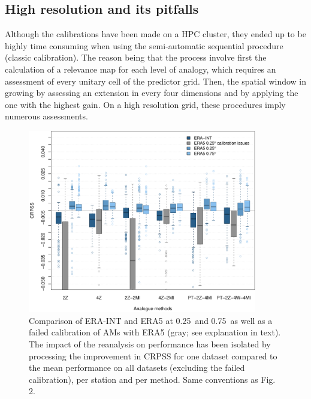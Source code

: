 \documentclass[alpha-refs]{wiley-article}
\begin{document}
\subsection{High resolution and its pitfalls}
\label{sec:results_hires}

Although the calibrations have been made on a HPC cluster, they ended up to be highly time consuming when using the semi-automatic sequential procedure (classic calibration). The reason being that the process involve first the calculation of a relevance map for each level of analogy, which requires an assessment of every unitary cell of the predictor grid. Then, the spatial window in growing by assessing an extension in every four dimensions and by applying the one with the highest gain. On a high resolution grid, these procedures imply numerous assessments.

\begin{figure}[bt]
	\centering
	\includegraphics[width=100mm]{figures/boxplot-resol-diff.pdf}
	\caption{Comparison of ERA-INT and ERA5 at 0.25\degree\ and 0.75\degree\ as well as a failed calibration of AMs with ERA5 (gray; see explanation in text). The impact of the reanalysis on performance has been isolated by processing the improvement in CRPSS for one dataset compared to the mean performance on all datasets (excluding the failed calibration), per station and per method. Same conventions as Fig. 2.}
	\label{fig:resolution}
\end{figure}
\end{document}
